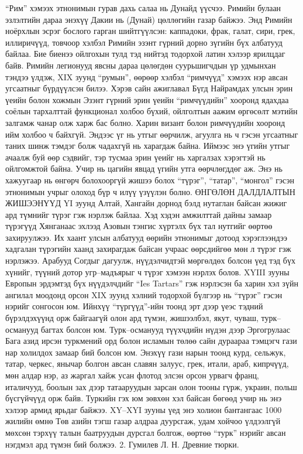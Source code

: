 “Рим” хэмээх этнонимын гурав дахь салаа нь Дунайд үүсчээ. Римийн булаан эзлэлтийн дараа энэхүү Дакии нь (Дунай) цөллөгийн газар байжээ. Энд Римийн ноёрхлын эсрэг бослого гарган шийтгүүлсэн: каппадоки, фрак, галат, сири, грек, иллиричүүд, товчоор хэлбэл Римийн эзэнт гүрний дорно зүгийн бүх албатууд байлаа. Бие биенээ ойлгохын тулд тэд нийтэд тодорхой латин хэлээр ярилцдаг байв. Римийн легионууд явсны дараа цөлөгдөн суурьшигчдын үр удмынхан тэндээ үлдэж, XIX зуунд “румын”, өөрөөр хэлбэл “римчүүд” хэмээх нэр авсан угсаатныг бүрдүүлсэн билээ.
Хэрэв сайн ажиглавал Бүгд Найрамдах улсын эрин үеийн болон хожмын Эзэнт гүрний эрин үеийн “римчүүдийн” хооронд ядахдаа соёлын тархалттай функционал холбоо бүхий, ойлголтын аажим өргөсөлт мэтийн залгамж чанар олж харж бас болно. Харин визант болон римчүүдийн хооронд ийм холбоо ч байхгүй. Эндээс үг нь утгыг өөрчилж, агуулга нь ч гэсэн угсаатныг таних шинж тэмдэг болж чадахгүй нь харагдаж байна. Иймээс энэ үгийн утгыг ачаалж буй өөр сэдвийг, тэр тусмаа эрин үеийг нь харгалзах хэрэгтэй нь ойлгомжтой байна. Учир нь цагийн явцад үгийн утга өөрчлөгддөг аж. Энэ нь хажуугаар нь өнгөрч болохооргүй жишээ болох “түрэг”, “татар”, “монгол” гэсэн этнонимын учрыг олоход бүр ч илүү үзүүлэн болно.
ӨНГӨЛӨН ДАЛДЛАЛТЫН ЖИШЭЭНҮҮД
YI зуунд Алтай, Хангайн дорнод бэлд нутаглан байсан жижиг ард түмнийг түрэг гэж нэрлэж байлаа. Хэд хэдэн амжилттай дайны замаар түрэгүүд Хянганаас эхлээд Азовын тэнгис хүртэлх бүх тал нутгийг өөртөө захируулжээ. Их хаант улсын албатууд өөрийн этнонимыг дотоод хэрэглээндээ хадгалан түрэгийн хаанд захирагдаж байсан учраас өөрсдийгөө мөн л түрэг гэж нэрлэжээ. Арабууд Согдыг дагуулж, нүүдэлчидтэй мөргөлдөх болсон үед тэд бүх хүнийг, түүний дотор угр–мадъярыг ч түрэг хэмээн нэрлэх болов. XYIII зууны Европын эрдэмтэд бүх нүүдэлчдийг “Ies Tartars” гэж нэрлэсэн ба харин хэл зүйн ангилал моодонд орсон XIX зуунд хэлний тодорхой бүлгээр нь “түрэг” гэсэн нэрийг сонгосон юм. Ийнхүү “түргүүд”-ийн тоонд эрт дээр үеэс тэдний бүрэлдэхүүнд орж байгаагүй олон ард түмэн, жишээлбэл, якут, чуваш, турк–османууд багтах болсон юм.
Турк–османууд түүхчдийн нүдэн дээр Эргогрулаас Бага азид ирсэн туркмений орд болон исламын төлөө сайн дураараа тэмцэгч гази нар холилдох замаар бий болсон юм. Энэхүү гази нарын тоонд курд, сельжук, татар, черкес, янычар болгон авсан славян залуус, грек, итали, араб, кипрчүүд, мөн алдар нэр, аз жаргал хайж усан флотод элсэн орсон урвагч франц, италичууд, боолын зах дээр татааруудын зарсан олон тооны гүрж, украин, польш бүсгүйчүүд орж байв. Туркийн гэх юм зөвхөн хэл байсан бөгөөд учир нь энэ хэлээр армид ярьдаг байжээ. XY–XYI зууны үед энэ холион бантангаас 1000 жилийн өмнө Төв азийн тэгш газар алдраа дуурсгаж, удам хойчоо үлдээлгүй мөхсөн тэрхүү талын баатруудын дурсгал болгож, өөртөө “турк” нэрийг авсан нэгдмэл ард түмэн бий болжээ. 2. Гумилев Л. Н. Древние тюрки.
